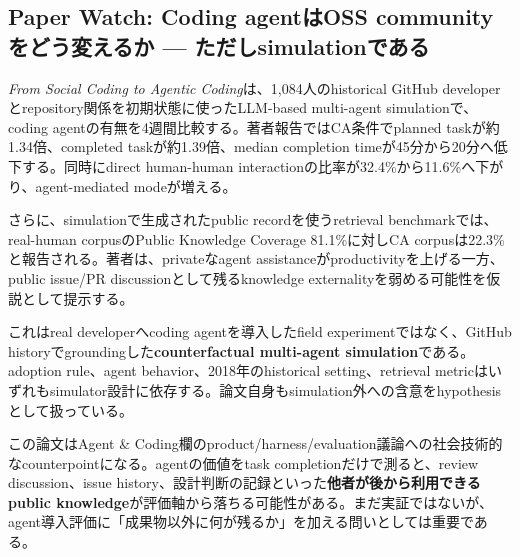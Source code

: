 \subsection*{Paper Watch: Coding agentはOSS communityをどう変えるか --- ただしsimulationである}

\textit{From Social Coding to Agentic Coding}は、1,084人のhistorical GitHub developerとrepository関係を初期状態に使ったLLM-based multi-agent simulationで、coding agentの有無を4週間比較する\cite{agentic-coding-paper}。著者報告ではCA条件でplanned taskが約1.34倍、completed taskが約1.39倍、median completion timeが45分から20分へ低下する。同時にdirect human-human interactionの比率が32.4\%から11.6\%へ下がり、agent-mediated modeが増える。

さらに、simulationで生成されたpublic recordを使うretrieval benchmarkでは、real-human corpusのPublic Knowledge Coverage 81.1\%に対しCA corpusは22.3\%と報告される\cite{agentic-coding-paper}。著者は、privateなagent assistanceがproductivityを上げる一方、public issue/PR discussionとして残るknowledge externalityを弱める可能性を仮説として提示する。

\begin{claimboundary}
これはreal developerへcoding agentを導入したfield experimentではなく、GitHub historyでgroundingした\textbf{counterfactual multi-agent simulation}である。adoption rule、agent behavior、2018年のhistorical setting、retrieval metricはいずれもsimulator設計に依存する。論文自身もsimulation外への含意をhypothesisとして扱っている\cite{agentic-coding-paper}。
\end{claimboundary}

この論文はAgent \& Coding欄のproduct/harness/evaluation議論への社会技術的なcounterpointになる。agentの価値をtask completionだけで測ると、review discussion、issue history、設計判断の記録といった\textbf{他者が後から利用できるpublic knowledge}が評価軸から落ちる可能性がある。まだ実証ではないが、agent導入評価に「成果物以外に何が残るか」を加える問いとしては重要である。
